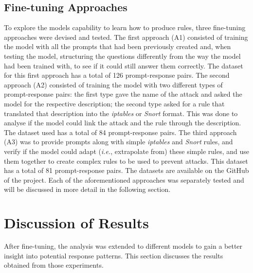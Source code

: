 \documentclass[sigconf]{acmart}
\begin{document}
\subsection{Fine-tuning Approaches}
To explore the models capability to learn how to produce rules, three fine-tuning approaches were devised and tested. The first approach (A1) consisted of training the model with all the prompts that had been previously created and, when testing the model, structuring the questions differently from the way the model had been trained with, to see if it could still answer them correctly. The dataset for this first approach has a total of 126 prompt-response pairs. The second approach (A2) consisted of training the model with two different types of prompt-response pairs: the first type gave the name of the attack and asked the model for the respective description; the second type asked for a rule that translated that description into the \textit{iptables} or \textit{Snort} format. This was done to analyse if the model could link the attack and the rule through the description. The dataset used has a total of 84 prompt-response pairs. The third approach (A3) was to provide prompts along with simple \textit{iptables} and \textit{Snort} rules, and verify if the model could adapt (\textit{i.e.}, extrapolate from) these simple rules, and use them together to create complex rules to be used to prevent attacks. This dataset has a total of 81 prompt-response pairs. The datasets are available on the GitHub of the project. Each of the aforementioned approaches was separately tested and will be discussed in more detail in the following section.

\section{Discussion of Results}
After fine-tuning, the analysis was extended to different models to gain a better insight into potential response patterns. This section discusses the results obtained from those experiments.
\end{document}
